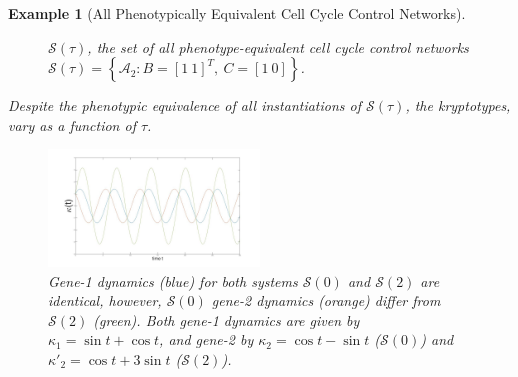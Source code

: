 \documentclass{article}
\newcommand{\calA}{\mathcal{A}}
\newcommand{\1}{\mathbbm{1}}
\newcommand{\Sys}{\mathcal{S}}
\newtheorem{example}{Example}
\begin{document}
\begin{example}[All Phenotypically Equivalent Cell Cycle Control Networks]
\begin{figure}[H]
\begin{tikzpicture}
\end{tikzpicture}
      \caption{$\Sys(\tau)$, the set of all phenotype-equivalent cell cycle control networks $\Sys (\tau) = \left\{ \calA_2 : B = [1\ 1]^{T} ,\ C = [1\ 0] \right\}$.}
    \end{figure}

   Despite the phenotypic equivalence of all instantiations of $\Sys(\tau)$, the kryptotypes, vary as a function of $\tau$. 
  \begin{figure}[H]
    \centering
    \includegraphics[width=0.5\textwidth, height=0.125\paperheight]{figures/osc_kryp_compare}
    \caption{Gene-1 dynamics (blue) for both systems $\Sys(0)$ and $\Sys(2)$ are identical, however, $\Sys(0)$ gene-2 dynamics (orange) differ from $\Sys(2)$ (green). Both gene-1 dynamics are given by $\kappa_{1} = \sin t + \cos t$, and gene-2 by $\kappa_{2} = \cos t - \sin t$ ($\Sys(0)$) and $\kappa'_{2} = \cos t + 3 \sin t$ ($\Sys(2)$).}
  \end{figure}
\end{example}
\end{document}
